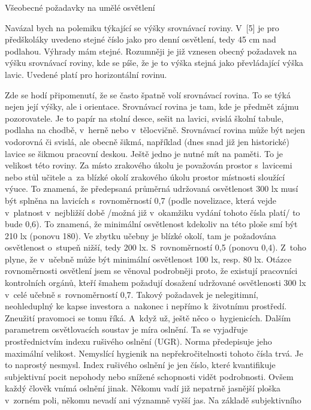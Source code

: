\chap Všeobecné požadavky na umělé osvětlení

Navázal bych na polemiku týkající se výšky srovnávací roviny. V~[5] je pro předškoláky uvedeno stejné číslo
jako pro denní osvětlení, tedy 45 cm nad podlahou. Výhrady mám stejné. Rozumněji je již vznesen obecný
požadavek na výšku srovnávací roviny, kde se píše, že je to výška stejná jako převládající výška lavic.
Uvedené platí pro horizontální rovinu.

\medskip
Zde se hodí připomenutí, že se často špatně volí srovnávací rovina. To se týká nejen její výšky,
ale i orientace. Srovnávací rovina je tam, kde je předmět zájmu pozorovatele. Je to papír na stolní
desce, sešit na lavici, svislá školní tabule, podlaha na chodbě, v~herně nebo v~tělocvičně.
Srovnávací rovina může být nejen vodorovná či svislá, ale obecně šikmá, například (dnes snad již jen historické)
 lavice se šikmou pracovní deskou.
\medskip
Ještě jedno je nutné mít na paměti. To je velikost této roviny. Za místo zrakového úkolu je považován prostor
s~lavicemi nebo stůl učitele a~za blízké okolí zrakového úkolu prostor místnosti sloužící výuce.
To znamená, že předepsaná průměrná udržovaná osvětlenost 300 lx musí být splněna na lavicích s~rovnoměrností 0,7
(podle novelizace, která vejde v~platnost v~nejbližší době /možná již v~okamžiku vydání tohoto čísla platí/ to bude 0,6).
 To znamená, že minimální osvětlenost kdekoliv na této ploše smí být 210 lx (ponovu 180).
 Ve zbytku učebny je blízké okolí, tam je požadována osvětlenost o~stupeň nižší, tedy 200 lx.
 S~rovnoměrností 0,5 (ponovu 0,4). Z~toho plyne, že v~učebně může být minimální osvětlenost 100 lx, resp. 80 lx.
 Otázce rovnoměrnosti osvětlení jsem se věnoval podrobněji proto, že existují pracovníci kontrolních orgánů,
 kteří šmahem požadují dosažení udržované osvětlenosti 300 lx v~celé učebně s~rovnoměrností 0,7.
 Takový požadavek je nelegitimní, neohleduplný ke kapse investora a~nakonec i nepřímo k~životnímu prostředí.
 Zneužití pravomoci se tomu říká.
\medskip
A~když už, ještě něco o~hygienicích. Dalším parametrem osvětlovacích soustav je míra oslnění.
Ta se vyjadřuje prostřednictvím indexu rušivého oslnění (UGR). Norma předepisuje jeho maximální velikost.
Nemyslící hygienik na nepřekročitelnosti tohoto čísla trvá. Je to naprostý nesmysl.
Index rušivého oslnění je jen číslo, které kvantifikuje subjektivní pocit nepohody nebo snížené
schopnosti vidět podrobnosti. Ovšem každý člověk vnímá oslnění jinak. Někomu vadí již nepatrně
jasnější ploška v~zorném poli, někomu nevadí ani významně vyšší jas. Na základě subjektivního
